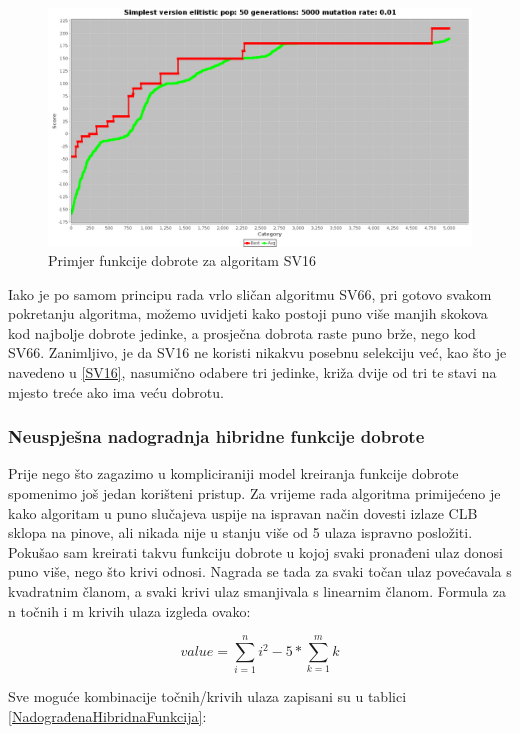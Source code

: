 \documentclass[times, utf8, zavrsni]{fer}
\begin{document}
\begin{figure}[!htb]
	\centering
	\includegraphics[width=18cm]{slike/SV16Hibrid.png}
	\caption{Primjer funkcije dobrote za algoritam SV16}
	\label{fig:sv16-alg-hibrid}
\end{figure} 

Iako je po samom principu rada vrlo sličan algoritmu SV66, pri gotovo svakom pokretanju algoritma, možemo uvidjeti kako postoji puno više manjih skokova kod najbolje dobrote jedinke, a prosječna dobrota raste puno brže, nego kod SV66. Zanimljivo, je da SV16 ne koristi nikakvu posebnu selekciju već, kao što je navedeno u \ref{SV16}, nasumično odabere tri jedinke, križa dvije od tri te stavi na mjesto treće ako ima veću dobrotu. 

\subsubsection{Neuspješna nadogradnja hibridne funkcije dobrote}

Prije nego što zagazimo u kompliciraniji model kreiranja funkcije dobrote spomenimo još jedan korišteni pristup. Za vrijeme rada algoritma primijećeno je kako algoritam u puno slučajeva uspije na ispravan način dovesti izlaze CLB sklopa na pinove, ali nikada nije u stanju više od 5 ulaza ispravno posložiti. Pokušao sam kreirati takvu funkciju dobrote u kojoj svaki pronađeni ulaz donosi puno više, nego što krivi odnosi. Nagrada se tada za svaki točan ulaz povećavala s kvadratnim članom, a svaki krivi ulaz smanjivala s linearnim članom. Formula za n točnih i m krivih ulaza izgleda ovako: 

\begin{equation}
	value=\sum_{i=1}^{n}i^2 - 5\ast \sum_{k=1}^{m}k
\end{equation}

Sve moguće kombinacije točnih/krivih ulaza zapisani su u tablici \ref{NadograđenaHibridnaFunkcija}: 
\end{document}
